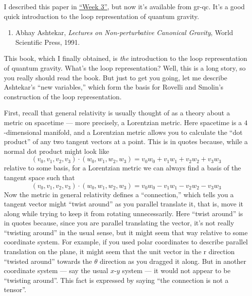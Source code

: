 \documentclass{article}
\def\tightlist{}
\begin{document}
I described this paper in \protect\hyperlink{week3}{``Week 3''}, but now
it's available from gr-qc. It's a good quick introduction to the loop
representation of quantum gravity.

\begin{enumerate}
\def\labelenumi{\arabic{enumi})}
\setcounter{enumi}{1}
\tightlist
\item
  Abhay Ashtekar, \emph{Lectures on Non-perturbative Canonical Gravity}, World Scientific Press, 1991.
\end{enumerate}

This book, which I finally obtained, is \emph{the} introduction to the
loop representation of quantum gravity. What's the loop representation?
Well, this is a long story, so you really should read the book. But just
to get you going, let me describe Ashtekar's ``new variables,'' which
form the basis for Rovelli and Smolin's construction of the loop
representation.

First, recall that general relativity is usually thought of as a theory
about a metric on spacetime --- more precisely, a Lorentzian metric.
Here spacetime is a \(4\)-dimensional manifold, and a Lorentzian metric
allows you to calculate the ``dot product'' of any two tangent vectors
at a point. This is in quotes because, while a normal dot product might
look like
\[(v_0,v_1,v_2,v_3)\cdot(w_0,w_1,w_2,w_3) = v_0w_0 + v_1w_1 + v_2w_2 + v_3w_3\]
relative to some basis, for a Lorentzian metric we can always find a
basis of the tangent space such that
\[(v_0,v_1,v_2,v_3)\cdot(w_0,w_1,w_2,w_3) = v_0w_0 -v_1w_1 -v_2w_2 -v_3w_3\]
Now the metric in general relativity defines a ``connection,'' which
tells you a tangent vector might ``twist around'' as you parallel
translate it, that is, move it along while trying to keep it from
rotating unnecessarily. Here ``twist around'' is in quotes because,
since you are parallel translating the vector, it's not really
``twisting around'' in the usual sense, but it might seem that way
relative to some coordinate system. For example, if you used polar
coordinates to describe parallel translation on the plane, it might seem
that the unit vector in the r direction ``twisted around'' towards the
\(\theta\) direction as you dragged it along. But in another coordinate
system --- say the usual \(x\)-\(y\) system --- it would not appear to
be ``twisting around''. This fact is expressed by saying ``the
connection is not a tensor''.
\end{document}
